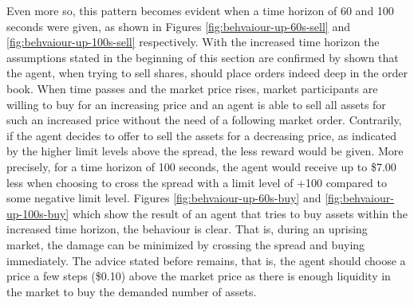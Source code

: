 Even more so, this pattern becomes evident when a time horizon of 60 and 100 seconds were given, as shown in Figures \ref{fig:behvaiour-up-60s-sell} and \ref{fig:behvaiour-up-100s-sell} respectively.
With the increased time horizon the assumptions stated in the beginning of this section are confirmed by shown that the agent, when trying to sell shares, should place orders indeed deep in the order book.
When time passes and the market price rises, market participants are willing to buy for an increasing price and an agent is able to sell all assets for such an increased price without the need of a following market order.
Contrarily, if the agent decides to offer to sell the assets for a decreasing price, as indicated by the higher limit levels above the spread, the less reward would be given.
More precisely, for a time horizon of 100 seconds, the agent would receive up to \$7.00 less when choosing to cross the spread with a limit level of +100 compared to some negative limit level.
Figures \ref{fig:behvaiour-up-60s-buy} and \ref{fig:behvaiour-up-100s-buy} which show the result of an agent that tries to buy assets within the increased time horizon, the behaviour is clear.
That is, during an uprising market, the damage can be minimized by crossing the spread and buying immediately.
The advice stated before remains, that is, the agent should choose a price a few steps (\$0.10) above the market price as there is enough liquidity in the market to buy the demanded number of assets.

